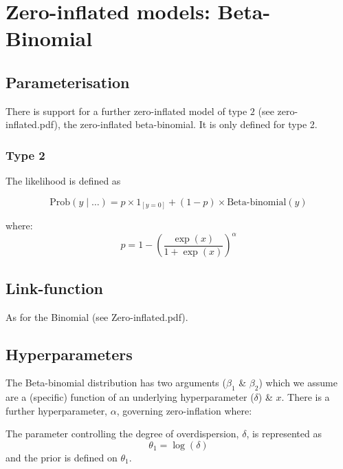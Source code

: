 \documentclass[a4paper,11pt]{article}
\begin{document}
\section*{Zero-inflated models: Beta-Binomial}

\subsection*{Parameterisation}

There is support for a further zero-inflated model of type
$2$ (see zero-inflated.pdf), the zero-inflated beta-binomial.
It is only defined for type 2.

\subsubsection*{Type 2}

The  likelihood is defined as

\begin{displaymath}
    \text{Prob}(y \mid \ldots ) = p \times 1_{[y=0]} +
    (1-p)\times \text{Beta-binomial}(y)
\end{displaymath}

where:
\begin{displaymath}
        p = 1-\left( \frac{\exp(x)}{1 + \exp(x)}\right)^{\alpha}
\end{displaymath}

\subsection*{Link-function}

As for the Binomial (see Zero-inflated.pdf).

\subsection*{Hyperparameters}

The Beta-binomial distribution has two arguments ($\beta_1$ \& $\beta_2$) which we assume are a (specific) function of an underlying hyperparameter ($\delta$) \& $x$. There is a further hyperparameter, $\alpha$, governing zero-inflation where:

\vspace{5mm}

\noindent
The parameter controlling the degree of overdispersion, $\delta$, is represented as
\begin{displaymath}
    \theta_{1} = \log(\delta)
\end{displaymath}
and the prior is defined on $\theta_{1}$. 
\end{document}
